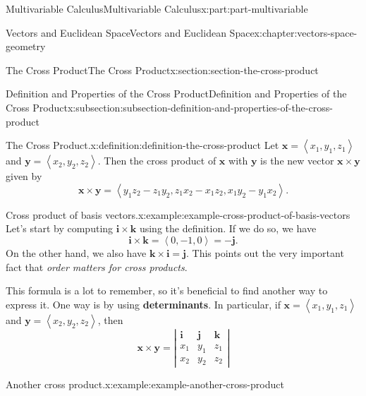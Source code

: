 \documentclass[twoside,10pt,]{book}
\newcommand{\terminology}[1]{\textbf{#1}}
\numberwithin{equation}{part}
\newcommand{\dotprod}[1]{\left\langle #1 \right\rangle}
\begin{document}
\begin{partptx}{Multivariable Calculus}{}{Multivariable Calculus}{}{}{x:part:part-multivariable}
\begin{chapterptx}{Vectors and Euclidean Space}{}{Vectors and Euclidean Space}{}{}{x:chapter:vectors-space-geometry}
\begin{sectionptx}{The Cross Product}{}{The Cross Product}{}{}{x:section:section-the-cross-product}
\begin{introduction}{}
\end{introduction}%
%
%
\typeout{************************************************}
\typeout{************************************************}
%
\begin{subsectionptx}{Definition and Properties of the Cross Product}{}{Definition and Properties of the Cross Product}{}{}{x:subsection:subsection-definition-and-properties-of-the-cross-product}
\begin{definition}{The Cross Product.}{x:definition:definition-the-cross-product}%
%
Let \(\mathbf{x} = \dotprod{x_{1},y_{1},z_{1}}\) and \(\mathbf{y} = \dotprod{x_{2},y_{2},z_{2}}\). Then the cross product of \(\mathbf{x}\) with \(\mathbf{y}\) is the new vector \(\mathbf{x}\times\mathbf{y}\) given by%
%
\begin{equation*}
\mathbf{x}\times\mathbf{y} = \dotprod{y_{1}z_{2}-z_{1}y_{2}, z_{1}x_{2}-x_{1}z_{2}, x_{1}y_{2} - y_{1}x_{2}}.
\end{equation*}
\end{definition}
\begin{example}{Cross product of basis vectors.}{x:example:example-cross-product-of-basis-vectors}%
Let's start by computing \(\mathbf{i}\times\mathbf{k}\) using the definition. If we do so, we have%
%
\begin{equation*}
\mathbf{i}\times\mathbf{k} = \dotprod{0,-1,0} = -\mathbf{j}.
\end{equation*}
On the other hand, we also have \(\mathbf{k}\times\mathbf{i} = \mathbf{j}\). This points out the very important fact that \emph{order matters for cross products}.%
\end{example}
This formula is a lot to remember, so it's beneficial to find another way to express it. One way is by using \terminology{determinants}. In particular, if \(\mathbf{x} = \dotprod{x_{1},y_{1},z_{1}}\) and \(\mathbf{y} = \dotprod{x_{2},y_{2},z_{2}}\), then%
%
\begin{equation}
\mathbf{x}\times\mathbf{y} = \left|\begin{array}{ccc}
\mathbf{i} & \mathbf{j} & \mathbf{k} \\ x_{1} & y_{1} & z_{1} \\ x_{2} & y_{2} & z_{2} \end{array}\right|\label{x:men:equation-cross-product-determinant}
\end{equation}
\begin{example}{Another cross product.}{x:example:example-another-cross-product}%

\end{example}
\end{subsectionptx}
\end{sectionptx}
\end{chapterptx}
\end{partptx}
\end{document}
